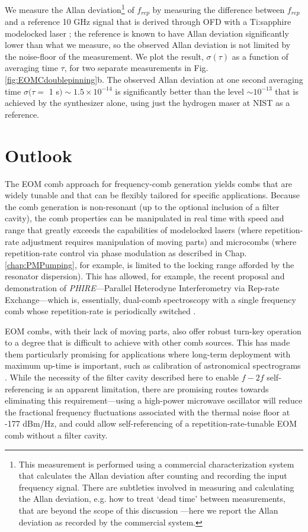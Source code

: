 We measure the Allan deviation\footnote{This measurement is performed using a commercial characterization system that calculates the Allan deviation after counting and recording the input frequency signal. There are subtleties involved in measuring and calculating the Allan deviation, e.g. how to treat `dead time' between measurements, that are beyond the scope of this discussion \cite{Levine1999}---here we report the Allan deviation as recorded by the commercial system.} of $f_{rep}$ by measuring the difference between $f_{rep}$ and a reference 10 GHz signal that is derived through OFD with a Ti:sapphire modelocked laser \cite{Fortier2011}; the reference is known to have Allan deviation significantly lower than what we measure, so the observed Allan deviation is not limited by the noise-floor of the measurement. We plot the result, $\sigma(\tau)$ as a function of averaging time $\tau$, for two separate measurements in Fig. \ref{fig:EOMCdoublepinning}b. The observed Allan deviation at one second averaging time $\sigma(\tau=$ 1 s$)\sim1.5\times10^{-14}$ is significantly better than the level $\sim10^{-13}$ that is achieved by the synthesizer alone, using just the hydrogen maser at NIST as a reference.



\section{Outlook}
The EOM comb approach for frequency-comb generation yields combs that are widely tunable and that can be flexibly tailored for specific applications. Because the comb generation is non-resonant (up to the optional inclusion of a filter cavity), the comb properties can be manipulated in real time with speed and range that greatly exceeds the capabilities of modelocked lasers (where repetition-rate adjustment requires manipulation of moving parts) and microcombs (where repetition-rate control via phase modulation as described in Chap. \ref{chap:PMPumping}, for example, is limited to the locking range afforded by the resonator dispersion). This has allowed, for example, the recent proposal and demonstration of \textit{PHIRE}---Parallel Heterodyne Interferometry via Rep-rate Exchange---which is, essentially, dual-comb spectroscopy \cite{Coddington2016} with a single frequency comb whose repetition-rate is periodically switched \cite{Carlson2018}. 

EOM combs, with their lack of moving parts, also offer robust turn-key operation to a degree that is difficult to achieve with other comb sources. This has made them particularly promising for applications where long-term deployment with maximum up-time is important, such as calibration of astronomical spectrograms \cite{Metcalf2018}. While the necessity of the filter cavity described here to enable $f-2f$ self-referencing is an apparent limitation, there are promising routes towards eliminating this requirement---using a high-power microwave oscillator will reduce the fractional frequency fluctuations associated with the thermal noise floor at -177 dBm/Hz, and could allow self-referencing of a repetition-rate-tunable EOM comb without a filter cavity.


